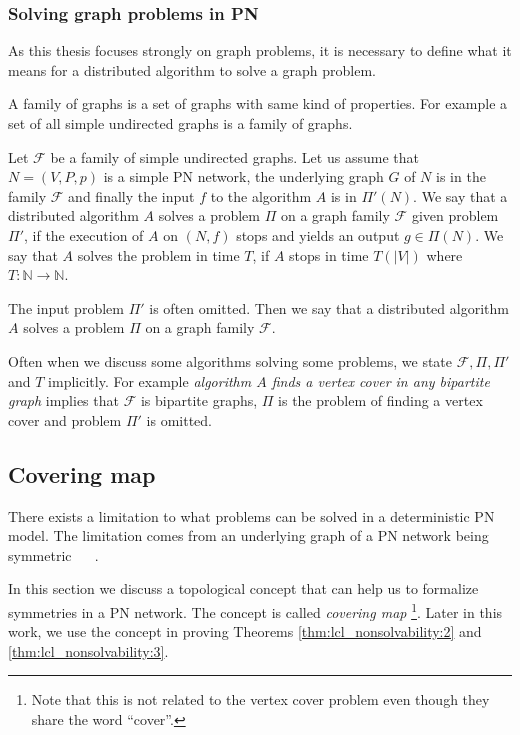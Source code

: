 
\subsubsection{Solving graph problems in PN}
As this thesis focuses strongly on graph problems, it is necessary to define what it means for a distributed algorithm to solve a graph problem.

A family of graphs is a set of graphs with same kind of properties.
For example a set of all simple undirected graphs is a family of graphs.

Let $\mathcal{F}$ be a family of simple undirected graphs.
Let us assume that $N=(V, P, p)$ is a simple PN network, the underlying graph $G$ of $N$ is in the family $\mathcal{F}$ and finally the input $f$ to the algorithm $A$ is in $\Pi'(N)$.
We say that a distributed algorithm $A$ solves a problem $\Pi$ on a graph family $\mathcal{F}$ given problem $\Pi'$, if the execution of $A$ on $(N, f)$ stops and yields an output $g \in \Pi(N)$.
We say that $A$ solves the problem in time $T$, if $A$ stops in time $T(|V|)$ where $T\colon \mathbb{N} \rightarrow \mathbb{N}$.

The input problem $\Pi'$ is often omitted.
Then we say that a distributed algorithm $A$ solves a problem $\Pi$ on a graph family $\mathcal{F}$.

Often when we discuss some algorithms solving some problems, we state $\mathcal{F}, \Pi, \Pi'$ and $T$ implicitly.
For example \emph{algorithm $A$ finds a vertex cover in any bipartite graph} implies that $\mathcal{F}$ is bipartite graphs, $\Pi$ is the problem of finding a vertex cover and problem $\Pi'$ is omitted.



\subsection{Covering map} \label{sec:covering_map}
There exists a limitation to what problems can be solved in a deterministic PN model.
The limitation comes from an underlying graph of a PN network being symmetric~%
\cite{DBLP:conf/focs/Linial87}~%
\cite{DBLP:journals/siamcomp/Linial92}.

In this section we discuss a topological concept that can help us to formalize symmetries in a PN network.
The concept is called \emph{covering map}%
\footnote{Note that this is not related to the vertex cover problem even though they share the word ``cover''.}.
Later in this work, we use the concept in proving Theorems \ref{thm:lcl_nonsolvability:2} and \ref{thm:lcl_nonsolvability:3}.

